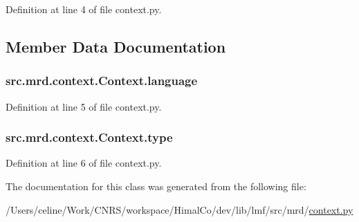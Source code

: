 Definition at line 4 of file context.\+py.



\subsection{Member Data Documentation}
\hypertarget{classsrc_1_1mrd_1_1context_1_1_context_ad504d055fa60193f73138b5fbd5a1bf2}{
\subsubsection[{language}]{\setlength{\rightskip}{0pt plus 5cm}src.\+mrd.\+context.\+Context.\+language}}\label{classsrc_1_1mrd_1_1context_1_1_context_ad504d055fa60193f73138b5fbd5a1bf2}


Definition at line 5 of file context.\+py.

\hypertarget{classsrc_1_1mrd_1_1context_1_1_context_aa58d522c3916eb637d7a3e8080dccdb3}{
\subsubsection[{type}]{\setlength{\rightskip}{0pt plus 5cm}src.\+mrd.\+context.\+Context.\+type}}\label{classsrc_1_1mrd_1_1context_1_1_context_aa58d522c3916eb637d7a3e8080dccdb3}


Definition at line 6 of file context.\+py.



The documentation for this class was generated from the following file\+:\begin{DoxyCompactItemize}
\item 
/\+Users/celine/\+Work/\+C\+N\+R\+S/workspace/\+Himal\+Co/dev/lib/lmf/src/mrd/\hyperlink{context_8py}{context.\+py}\end{DoxyCompactItemize}
